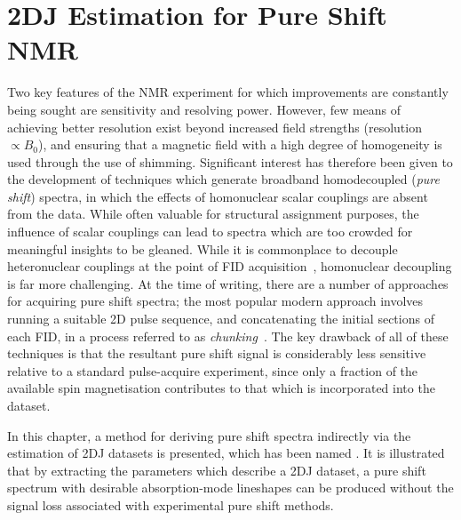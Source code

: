 \chapter{2DJ Estimation for Pure Shift NMR}
\label{chap:cupid}
Two key features of the \ac{NMR} experiment for which improvements are
constantly being sought are sensitivity and resolving power.
However, few means of achieving better resolution exist beyond increased field
strengths (resolution $\propto B_0$), and ensuring that a magnetic
field with a high degree of homogeneity is used through the use of shimming.
Significant interest has therefore
been given to the development of techniques which generate broadband homodecoupled
(\emph{pure shift}) spectra, in which the effects of homonuclear scalar
couplings are absent from the data. While often valuable for structural
assignment purposes, the influence of scalar couplings can lead to spectra
which are too crowded for meaningful insights to be gleaned. While it is
commonplace to decouple heteronuclear couplings at the point of \ac{FID}
acquisition~\cite{Shaka1983a, Shaka1983b,Shaka1985}, homonuclear decoupling is
far more challenging. At the time of writing, there are a number of approaches
for acquiring pure shift spectra; the most popular modern approach
involves running a suitable \ac{2D} pulse sequence, and concatenating the initial
sections of each \ac{FID}, in a process referred to as
\emph{chunking}~\cite{Meyer2013,Adams2014,Zangger2015}. The key drawback of all of
these techniques is that the resultant pure shift signal is considerably less
sensitive relative to a standard pulse-acquire experiment, since only a
fraction of the available spin magnetisation contributes to that which is
incorporated into the dataset.

In this chapter, a method for deriving pure shift spectra indirectly via the
estimation of \ac{2DJ} datasets is presented, which has been named
. It is illustrated that by extracting the parameters which
describe a \ac{2DJ} dataset, a pure shift spectrum with desirable
absorption-mode lineshapes can be produced without the signal loss associated
with experimental pure shift methods.





